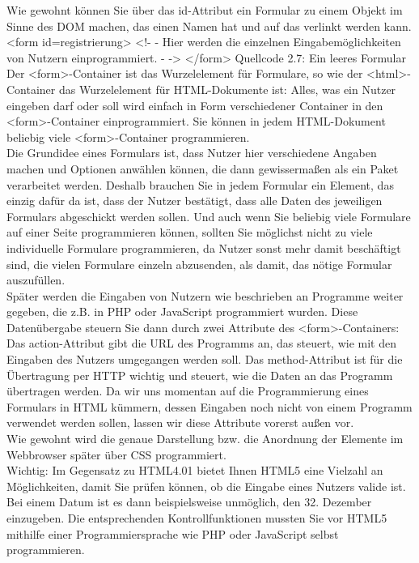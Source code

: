 Wie gewohnt können Sie über das id-Attribut ein Formular zu einem Objekt im Sinne des DOM machen, das einen Namen hat und auf das verlinkt werden kann.\\

<form id=registrierung>
<!- - Hier werden die einzelnen Eingabemöglichkeiten von Nutzern einprogrammiert. - ->
</form>
Quellcode 2.7: Ein leeres Formular\\

Der <form>-Container ist das Wurzelelement für Formulare, so wie der <html>-Container das Wurzelelement für HTML-Dokumente ist: Alles, was ein Nutzer eingeben darf oder soll wird einfach in Form verschiedener Container in den <form>-Container einprogrammiert. Sie können in jedem HTML-Dokument beliebig viele <form>-Container programmieren.\\

Die Grundidee eines Formulars ist, dass Nutzer hier verschiedene Angaben machen und Optionen anwählen können, die dann gewissermaßen als ein Paket verarbeitet werden. Deshalb brauchen Sie in jedem Formular ein Element, das einzig dafür da ist, dass der Nutzer bestätigt, dass alle Daten des jeweiligen Formulars abgeschickt werden sollen. Und auch wenn Sie beliebig viele Formulare auf einer Seite programmieren können, sollten Sie möglichst nicht zu viele individuelle Formulare programmieren, da Nutzer sonst mehr damit beschäftigt sind, die vielen Formulare einzeln abzusenden, als damit, das nötige Formular auszufüllen.\\

Später werden die Eingaben von Nutzern wie beschrieben an Programme weiter gegeben, die z.B. in PHP oder JavaScript programmiert wurden. Diese Datenübergabe steuern Sie dann durch zwei Attribute des <form>-Containers: Das action-Attribut gibt die URL des Programms an, das steuert, wie mit den Eingaben des Nutzers umgegangen werden soll. Das method-Attribut ist für die Übertragung per HTTP wichtig und steuert, wie die Daten an das Programm übertragen werden. Da wir uns momentan auf die Programmierung eines Formulars in HTML kümmern, dessen Eingaben noch nicht von einem Programm verwendet werden sollen, lassen wir diese Attribute vorerst außen vor.\\

Wie gewohnt wird die genaue Darstellung bzw. die Anordnung der Elemente im Webbrowser später über CSS programmiert.\\

Wichtig: Im Gegensatz zu HTML4.01 bietet Ihnen HTML5 eine Vielzahl an Möglichkeiten, damit Sie prüfen können, ob die Eingabe eines Nutzers valide ist. Bei einem Datum ist es dann beispielsweise unmöglich, den 32. Dezember einzugeben. Die entsprechenden Kontrollfunktionen mussten Sie vor HTML5 mithilfe einer Programmiersprache wie PHP oder JavaScript selbst programmieren.

